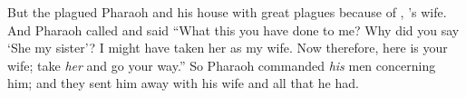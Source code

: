 \bverse But the \lord plagued Pharaoh and his house with great plagues because of , 's wife.
\bverse And Pharaoh called  and said ``What \is this you have done to me? Why did you say `She \is my sister'? I might have taken her as my wife. Now therefore, here is your wife; take \textit{her} and go your way.''
\bverse So Pharaoh commanded \textit{his} men concerning him; and they sent him away with his wife and all that he had.